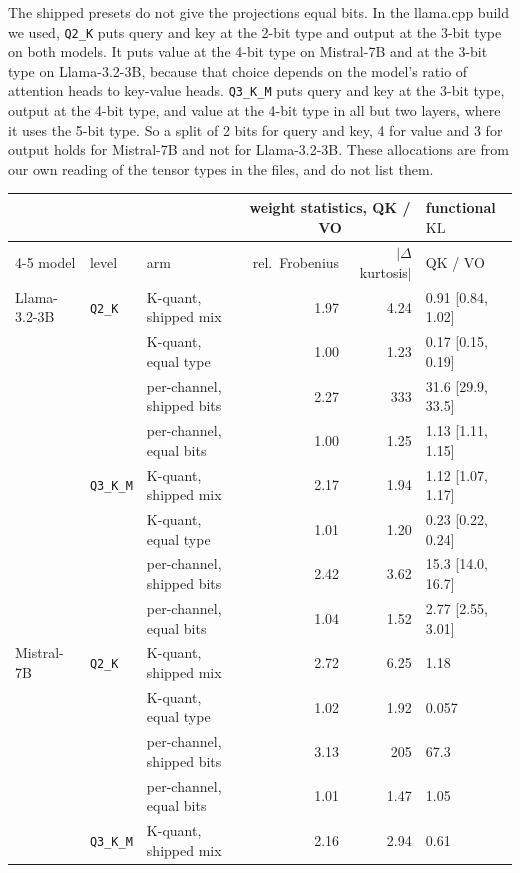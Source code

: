 \documentclass[10pt]{article}
\newcommand{\KL}{\mathrm{KL}}
\begin{document}
The shipped presets do not give the projections equal bits. In the llama.cpp build we used,
\texttt{Q2\_K} puts query and key at the 2-bit type and output at the 3-bit type on both models.
It puts value at the 4-bit type on Mistral-7B and at the 3-bit type on Llama-3.2-3B, because
that choice depends on the model's ratio of attention heads to key-value heads. \texttt{Q3\_K\_M}
puts query and key at the 3-bit type, output at the 4-bit type, and value at the 4-bit type in
all but two layers, where it uses the 5-bit type. So a split of 2 bits for query and key, 4 for value and 3 for output holds for Mistral-7B
and not for Llama-3.2-3B. These allocations are from our own reading of the tensor types in the
files, and \citet{rababah2026illusion} do not list them.

\begin{table}[t]
\centering
\small
\begin{tabular}{lllrrl}
\toprule
 & & & \multicolumn{2}{c}{weight statistics, QK / VO} & functional $\KL$ \\
\cmidrule(lr){4-5}
model & level & arm & rel.\ Frobenius & $|\Delta$kurtosis$|$ & QK / VO \\
\midrule
Llama-3.2-3B & \texttt{Q2\_K} & K-quant, shipped mix & 1.97 & 4.24 & 0.91 [0.84, 1.02] \\
 & & K-quant, equal type & 1.00 & 1.23 & 0.17 [0.15, 0.19] \\
 & & per-channel, shipped bits & 2.27 & 333 & 31.6 [29.9, 33.5] \\
 & & per-channel, equal bits & 1.00 & 1.25 & 1.13 [1.11, 1.15] \\
 & \texttt{Q3\_K\_M} & K-quant, shipped mix & 2.17 & 1.94 & 1.12 [1.07, 1.17] \\
 & & K-quant, equal type & 1.01 & 1.20 & 0.23 [0.22, 0.24] \\
 & & per-channel, shipped bits & 2.42 & 3.62 & 15.3 [14.0, 16.7] \\
 & & per-channel, equal bits & 1.04 & 1.52 & 2.77 [2.55, 3.01] \\
\midrule
Mistral-7B & \texttt{Q2\_K} & K-quant, shipped mix & 2.72 & 6.25 & 1.18 \\
 & & K-quant, equal type & 1.02 & 1.92 & 0.057 \\
 & & per-channel, shipped bits & 3.13 & 205 & 67.3 \\
 & & per-channel, equal bits & 1.01 & 1.47 & 1.05 \\
 & \texttt{Q3\_K\_M} & K-quant, shipped mix & 2.16 & 2.94 & 0.61 \\

\end{tabular}
\end{table}
\end{document}
